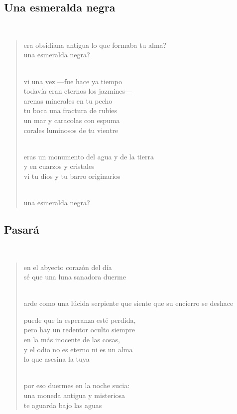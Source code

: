 \documentclass[a4paper, 12pt]{article}
\begin{document}
\pagebreak 
\subsection{Una esmeralda negra}
~

\begin{verse}
    
era obsidiana antigua lo que formaba tu alma?\\
una esmeralda negra?\\
~ 

vi una vez —fue hace ya tiempo\\
todavía eran eternos los jazmines—\\
arenas minerales en tu pecho\\
tu boca una fractura de rubíes\\
un mar y caracolas con espuma\\
corales luminosos de tu vientre\\
~ 

eras un monumento del agua y de la tierra\\
y en cuarzos y cristales\\
vi tu dios y tu barro originarios\\
~ 

una esmeralda negra?\\
\end{verse}

\pagebreak 
\subsection{Pasará}
~

\begin{verse}
    
en el abyecto corazón del día\\
sé que una luna sanadora duerme\\
~ 

arde como una lúcida serpiente 
que siente que su encierro se deshace
~

puede que la esperanza esté perdida,\\
pero hay un redentor oculto siempre\\
en la más inocente de las cosas,\\
y el odio no es eterno ni es un alma\\
lo que asesina la tuya\\
~

por eso duermes en la noche sucia:\\
una moneda antigua y misteriosa\\
te aguarda bajo las aguas\\
\end{verse}
\end{document}
